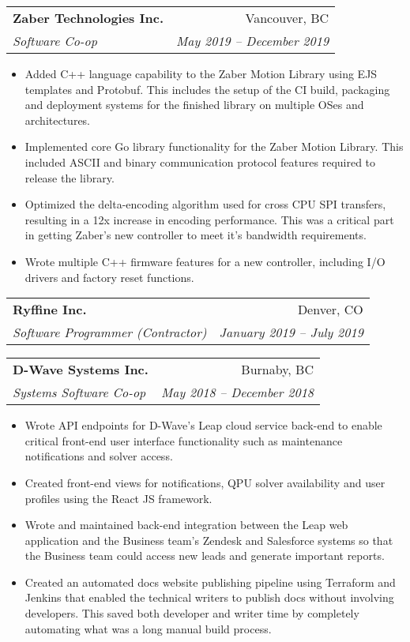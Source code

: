 \documentclass[letterpaper,11pt]{article}
\makeatletter
\newcommand{\resumeItem}[2]{
  \item\small{
    \textbf{#1}{#2 \vspace{-2pt}}
  }
}
\newcommand{\resumeSubheading}[4]{
  \vspace{-1pt}\item
    \begin{tabular*}{0.97\textwidth}[t]{l@{\extracolsep{\fill}}r}
      \textbf{#1} & #2 \\
      \textit{\small#3} & \textit{\small #4} \\
    \end{tabular*}\vspace{-5pt}
}
\newcommand{\resumeItemListStart}{\begin{itemize}}
\newcommand{\resumeItemListEnd}{\end{itemize}\vspace{-5pt}}
\makeatother
\begin{document}
    \resumeSubheading
      {Zaber Technologies Inc.}{Vancouver, BC}
      {Software Co-op}{May 2019 -- December 2019}
      \resumeItemListStart
        \resumeItem{} {Added C++ language capability to the Zaber Motion Library using EJS templates and Protobuf. This includes the setup of the CI build, packaging and deployment systems for the finished library on multiple OSes and architectures.}
        \resumeItem{} {Implemented core Go library functionality for the Zaber Motion Library. This included ASCII and binary communication protocol features required to release the library.}
        \resumeItem{} {Optimized the delta-encoding algorithm used for cross CPU SPI transfers, resulting in a 12x increase in encoding performance. This was a critical part in getting Zaber's new controller to meet it's bandwidth requirements.}
        \resumeItem{} {Wrote multiple C++ firmware features for a new controller, including I/O drivers and factory reset functions.}
      \resumeItemListEnd

    \resumeSubheading
      {Ryffine Inc.}{Denver, CO}
      {Software Programmer (Contractor)}{January 2019 -- July 2019}
      \resumeItemListStart
      \resumeItemListEnd

    \resumeSubheading
      {D-Wave Systems Inc.}{Burnaby, BC}
      {Systems Software Co-op}{May 2018 -- December 2018}
      \resumeItemListStart
        \resumeItem{} {Wrote API endpoints for D-Wave's Leap cloud service back-end to enable critical front-end user interface functionality such as maintenance notifications and solver access.}
        \resumeItem{} {Created front-end views for notifications, QPU solver availability and user profiles using the React JS framework.}
        \resumeItem{} {Wrote and maintained back-end integration between the Leap web application and the Business team's Zendesk and Salesforce systems so that the Business team could access new leads and generate important reports.}
        \resumeItem{} {Created an automated docs website publishing pipeline using Terraform and Jenkins that enabled the technical writers to publish docs without involving developers. This saved both developer and writer time by completely automating what was a long manual build process.}
      \resumeItemListEnd
\end{document}
